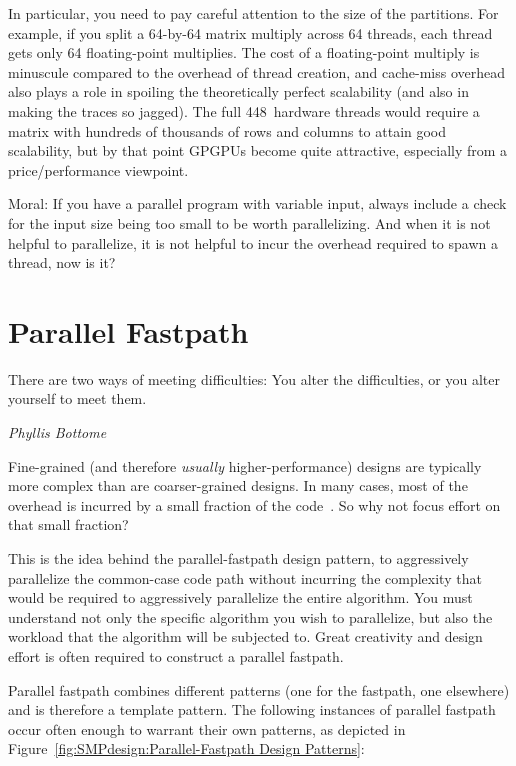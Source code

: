 {	In particular, you need to pay careful attention to the
	size of the partitions.
	For example, if you split a 64-by-64 matrix multiply across
	64 threads, each thread gets only 64 floating-point multiplies.
	The cost of a floating-point multiply is minuscule compared to
	the overhead of thread creation, and cache-miss overhead
	also plays a role in spoiling the theoretically perfect scalability
	(and also in making the traces so jagged).
	The full 448~hardware threads would require a matrix with
	hundreds of thousands of rows and columns to attain good
	scalability, but by that point GPGPUs become quite attractive,
	especially from a price/performance viewpoint.

	Moral: If you have a parallel program with variable input,
	always include a check for the input size being too small to
	be worth parallelizing.
	And when it is not helpful to parallelize, it is not helpful
	to incur the overhead required to spawn a thread, now is it?

	\fi
}\QuickQuizEnd

\section{Parallel Fastpath}
\label{sec:SMPdesign:Parallel Fastpath}
%
\epigraph{There are two ways of meeting difficulties: You alter the
	  difficulties, or you alter yourself to meet them.}
	 {\emph{Phyllis Bottome}}

Fine-grained (and therefore \emph{usually} higher-performance)
designs are typically more complex than are coarser-grained designs.
In many cases, most of the overhead is incurred by a small fraction
of the code~\cite{Knuth73}.
So why not focus effort on that small fraction?

This is the idea behind the parallel-fastpath design pattern, to aggressively
parallelize the common-case code path without incurring the complexity
that would be required to aggressively parallelize the entire algorithm.
You must understand not only the specific algorithm you wish
to parallelize, but also the workload that the algorithm will
be subjected to.  Great creativity and design
effort is often required to construct a parallel fastpath.

Parallel fastpath combines different patterns (one for the
fastpath, one elsewhere) and is therefore a template pattern.
The following instances of parallel
fastpath occur often enough to warrant their own patterns,
as depicted in Figure~\ref{fig:SMPdesign:Parallel-Fastpath Design Patterns}:

